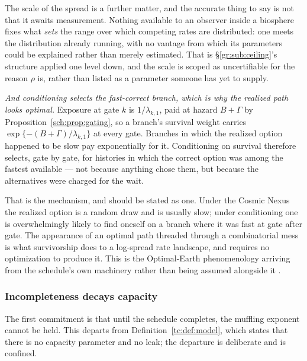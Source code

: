 \documentclass[11pt]{article}
\numberwithin{equation}{section}
\theoremstyle{plain}
\theoremstyle{definition}
\theoremstyle{remark}
\begin{document}
The scale of the spread is a further matter, and the accurate thing to say is not that it awaits measurement. Nothing available to an observer
inside a biosphere fixes what \emph{sets} the range over which competing
rates are distributed: one meets the distribution already running, with
no vantage from which its parameters could be explained rather than
merely estimated. That is \S\ref{gr:sub:ceiling}'s structure applied one
level down, and the scale is scoped as uncertifiable for the reason
$\rho$ is, rather than listed as a parameter someone has yet to
supply.

\emph{And conditioning selects the fast-correct branch, which is why the
realized path looks optimal.} Exposure at gate $k$ is $1/\lambda_{k,1}$,
paid at hazard $B+\Gamma$ by Proposition~\ref{sch:prop:gating}, so a
branch's survival weight carries $\exp\{-(B+\Gamma)/\lambda_{k,1}\}$ at
every gate. Branches in which the realized option happened to be slow
pay exponentially for it. Conditioning on survival therefore selects,
gate by gate, for histories in which the correct option was among the
fastest available --- not because anything chose them, but because the
alternatives were charged for the wait.

That is the mechanism, and should be stated as one. Under the Cosmic Nexus the
realized option is a random draw and is usually slow; under conditioning
one is overwhelmingly likely to find oneself on a branch where it was
fast at gate after gate. The appearance of an optimal path threaded
through a combinatorial mess is what survivorship does to a log-spread
rate landscape, and requires no optimization to produce it. This is the
Optimal-Earth phenomenology arriving from the schedule's own machinery
rather than being assumed alongside it \cite{Nexus, Ben26Optimal}.

\subsubsection{Incompleteness decays capacity}\label{sch:subsub:leak}

The first commitment is that until the schedule completes, the muffling
exponent cannot be held. This departs from
Definition~\ref{tc:def:model}, which states that there is no capacity
parameter and no leak; the departure is deliberate and is confined.
\end{document}
